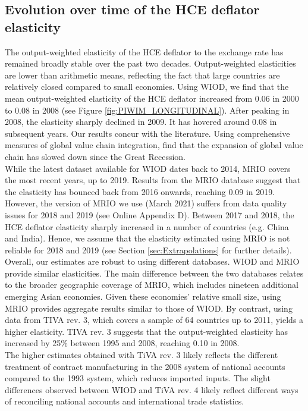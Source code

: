 \documentclass[11pt,a4paper]{paper} %
\begin{document}
\subsection{Evolution over time of the HCE deflator elasticity}\label{subsec:timeevol}
The output-weighted elasticity of the HCE deflator to the exchange rate has remained broadly stable over the past two decades.
Output-weighted elasticities are lower than arithmetic means, reflecting the fact that large countries are relatively closed compared to small economies.
Using WIOD, we find that the mean output-weighted elasticity of the HCE deflator increased from 0.06 in 2000 to 0.08 in 2008 (see Figure \ref{fig:PIWIM_LONGITUDINAL}). 
After peaking in 2008, the elasticity sharply declined in 2009. It has hovered around 0.08 in subsequent years. 
Our results concur with the literature.
Using comprehensive measures of global value chain integration, \cite{Timmer2016} find that the expansion of global value chain has slowed down since the Great Recession.\\
While the latest dataset available for WIOD dates back to 2014, MRIO covers the most recent years, up to 2019. 
Results from the MRIO database suggest that the elasticity has bounced back from 2016 onwards, reaching 0.09 in 2019.
However, the version of MRIO we use (March 2021) suffers from data quality issues for 2018 and 2019 (see Online Appendix D). Between 2017 and 2018, the HCE deflator elasticity sharply increased in a number of countries (e.g. China and India). 
Hence, we assume that the elasticity estimated using MRIO is not reliable for 2018 and 2019 (see Section \ref{sec:Extrapolations} for further details).\\
Overall, our estimates are robust to using different databases.
WIOD and MRIO provide similar elasticities. 
The main difference between the two databases relates to the broader geographic coverage of MRIO, which includes nineteen additional emerging Asian economies. 
Given these economies' relative small size, using MRIO provides aggregate results similar to those of WIOD.
By contrast, using data from TIVA rev. 3, which covers a sample of 64 countries up to 2011, yields a higher elasticity. 
TIVA rev. 3 suggests that the output-weighted elasticity has increased by 25\% between 1995 and 2008, reaching 0.10 in 2008. \\
The higher estimates obtained with TiVA rev. 3 likely reflects the different treatment of contract manufacturing in the 2008 system of national accounts compared to the 1993 system, which reduces imported inputs.
The slight differences observed between WIOD and TiVA rev. 4 likely reflect different ways of reconciling national accounts and international trade statistics.
\end{document}
